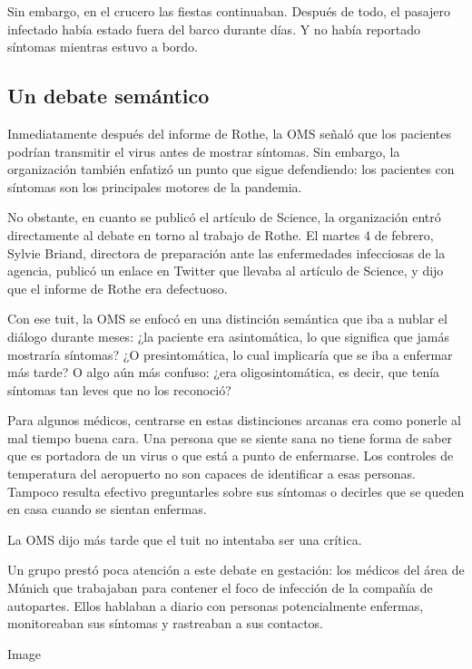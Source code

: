 Sin embargo, en el crucero las fiestas continuaban. Después de todo, el
pasajero infectado había estado fuera del barco durante días. Y no había
reportado síntomas mientras estuvo a bordo.

\hypertarget{un-debate-semuxe1ntico}{%
\subsection{Un debate semántico}\label{un-debate-semuxe1ntico}}

Inmediatamente después del informe de Rothe, la OMS señaló que los
pacientes podrían transmitir el virus antes de mostrar síntomas. Sin
embargo, la organización también enfatizó un punto que sigue
defendiendo: los pacientes con síntomas son los principales motores de
la pandemia.

No obstante, en cuanto se publicó el artículo de Science, la
organización entró directamente al debate en torno al trabajo de Rothe.
El martes 4 de febrero, Sylvie Briand, directora de preparación ante las
enfermedades infecciosas de la agencia, publicó un enlace en Twitter que
llevaba al artículo de Science, y dijo que el informe de Rothe era
defectuoso.

Con ese tuit, la OMS se enfocó en una distinción semántica que iba a
nublar el diálogo durante meses: ¿la paciente era asintomática, lo que
significa que jamás mostraría síntomas? ¿O presintomática, lo cual
implicaría que se iba a enfermar más tarde? O algo aún más confuso: ¿era
oligosintomática, es decir, que tenía síntomas tan leves que no los
reconoció?

Para algunos médicos, centrarse en estas distinciones arcanas era como
ponerle al mal tiempo buena cara. Una persona que se siente sana no
tiene forma de saber que es portadora de un virus o que está a punto de
enfermarse. Los controles de temperatura del aeropuerto no son capaces
de identificar a esas personas. Tampoco resulta efectivo preguntarles
sobre sus síntomas o decirles que se queden en casa cuando se sientan
enfermas.

La OMS dijo más tarde que el tuit no intentaba ser una crítica.

Un grupo prestó poca atención a este debate en gestación: los médicos
del área de Múnich que trabajaban para contener el foco de infección de
la compañía de autopartes. Ellos hablaban a diario con personas
potencialmente enfermas, monitoreaban sus síntomas y rastreaban a sus
contactos.

Image


